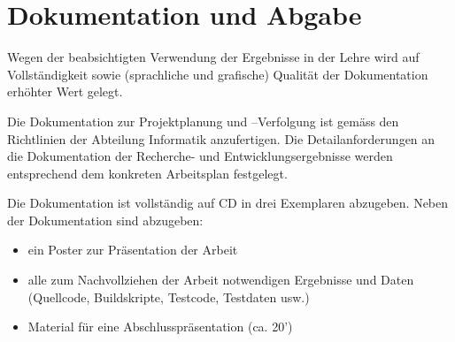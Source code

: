 \section{Dokumentation und Abgabe}
Wegen der beabsichtigten Verwendung der Ergebnisse in der Lehre wird auf
Vollständigkeit sowie (sprachliche und grafische) Qualität der Dokumentation
erhöhter Wert gelegt.

Die Dokumentation zur Projektplanung und –Verfolgung ist gemäss den Richtlinien
der Abteilung Informatik anzufertigen. Die Detailanforderungen an die
Dokumentation der Recherche- und Entwicklungsergebnisse werden entsprechend dem
konkreten Arbeitsplan festgelegt.

Die Dokumentation ist vollständig auf CD in drei Exemplaren abzugeben.
Neben der Dokumentation sind abzugeben:

\begin{itemize}
    \item ein Poster zur Präsentation der Arbeit
    \item alle zum Nachvollziehen der Arbeit notwendigen Ergebnisse und Daten (Quellcode,
        Buildskripte, Testcode, Testdaten usw.)
    \item Material für eine Abschlusspräsentation (ca. 20’)
\end{itemize}

